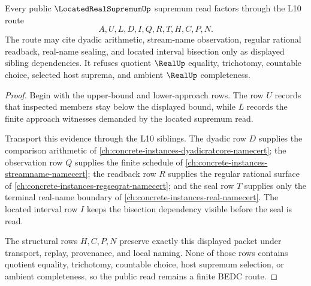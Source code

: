 \begin{theorem}
\label{thm:located-real-supremum-l10-route}
Every public $\LocatedRealSupremumUp$ supremum read factors through the L10 route
$$
A,U,L,D,I,Q,R,T,H,C,P,N .
$$
The route may cite dyadic arithmetic, stream-name observation, regular rational readback, real-name sealing, and located interval bisection only as displayed sibling dependencies. It refuses quotient $\RealUp$ equality, trichotomy, countable choice, selected host suprema, and ambient $\RealUp$ completeness.
\end{theorem}
\begin{proof}
Begin with the upper-bound and lower-approach rows. The row $U$ records that inspected members stay below the displayed bound, while $L$ records the finite approach witnesses demanded by the located supremum read.

Transport this evidence through the L10 siblings. The dyadic row $D$ supplies the comparison arithmetic of \autoref{ch:concrete-instances-dyadicratcore-namecert}; the observation row $Q$ supplies the finite schedule of \autoref{ch:concrete-instances-streamname-namecert}; the readback row $R$ supplies the regular rational surface of \autoref{ch:concrete-instances-regseqrat-namecert}; and the seal row $T$ supplies only the terminal real-name boundary of \autoref{ch:concrete-instances-real-namecert}. The located interval row $I$ keeps the bisection dependency visible before the seal is read.

The structural rows $H,C,P,N$ preserve exactly this displayed packet under transport, replay, provenance, and local naming. None of those rows contains quotient equality, trichotomy, countable choice, host supremum selection, or ambient completeness, so the public read remains a finite BEDC route.
\end{proof}


